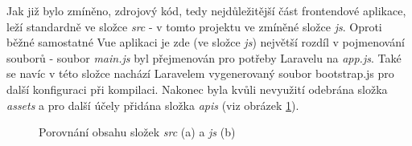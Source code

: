 	Jak již bylo zmíněno, zdrojový kód, tedy nejdůležitější část frontendové aplikace, leží standardně ve složce \textit{src} - v tomto projektu ve zmíněné složce \textit{js}. Oproti běžné samostatné Vue aplikaci je zde (ve složce \textit{js}) největší rozdíl v pojmenování souborů - soubor \textit{main.js} byl přejmenován pro potřeby Laravelu na \textit{app.js}. Také se navíc v této složce nachází Laravelem vygenerovaný soubor bootstrap.js pro další konfiguraci při kompilaci. Nakonec byla kvůli nevyužití odebrána složka \textit{assets} a pro další účely přidána složka \textit{apis} (viz obrázek \ref{fig:zdroj_kod_vue_rozdily}).
	
	\begin{figure}[h]
		\centering
		\qquad
		\caption{Porovnání obsahu složek \textit{src} (a) a \textit{js} (b)}
		\label{fig:zdroj_kod_vue_rozdily}
	\end{figure}


